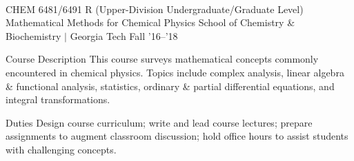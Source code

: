 \\


\begin{cventries}


  \cvteachingentry
    {CHEM 6481/6491 R (Upper-Division Undergraduate/Graduate Level)} %
    {Mathematical Methods for Chemical Physics} %
    {School of Chemistry \& Biochemistry $\vert$ Georgia Tech} %
    {Fall '16--'18} %
    {%
    \begin{cvdescription}
    \item[Course Description] This course surveys mathematical concepts commonly
            encountered in chemical physics.  Topics include complex analysis, linear
            algebra \& functional analysis, statistics, ordinary \& partial differential
            equations, and integral transformations.
    \item[Duties] Design course curriculum; write and lead course lectures; prepare 
            assignments to augment classroom discussion; hold office hours to assist 
            students with challenging concepts.
    \end{cvdescription}
    }

\end{cventries}


